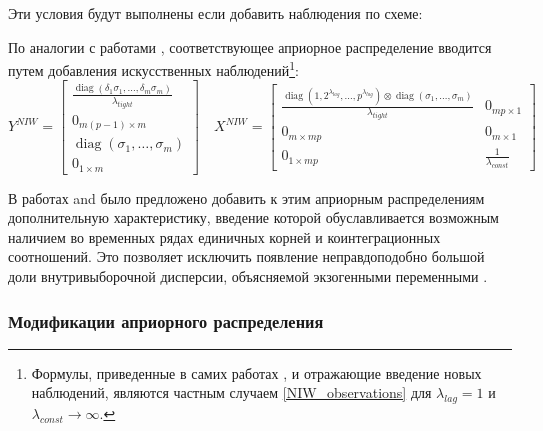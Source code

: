 \documentclass[11pt]{article} %
\DeclareMathOperator{\diag}{diag}
\begin{document}
Эти условия будут выполнены если добавить наблюдения по схеме:

По аналогии с  работами  \cite{banbura_al_2010}, \cite{berg_henzel_2013} соответствующее априорное распределение вводится путем добавления искусственных наблюдений\footnote{Формулы, приведенные в самих работах \cite{banbura_al_2010}, \cite{berg_henzel_2013} и отражающие введение новых наблюдений, являются частным случаем \eqref{NIW_observations} для $\lambda_{lag}=1$ и $\lambda_{const}\to\infty$.}:
\begin{equation}
Y^{NIW}=\begin{bmatrix}
\frac{\diag(\delta_1\sigma_1,\ldots, \delta_m\sigma_m)}{\lambda_{tight}}\\
0_{m(p-1)\times m}\\
\diag(\sigma_1,\ldots,\sigma_m)\\
0_{1\times m}
\end{bmatrix}
\quad
%
X^{NIW}=\begin{bmatrix}
\frac{\diag(1,2^{\lambda_{lag}},\ldots, p^{\lambda_{lag}})\otimes \diag(\sigma_1,\ldots,\sigma_m)}{\lambda_{tight}} & 0_{mp\times 1} \\
0_{m\times mp}&0_{m\times 1}\\
0_{1\times mp}&\frac{1}{\lambda_{const}}
\end{bmatrix}\label{NIW_observations}
\end{equation}





В работах \cite{doan_al_1984} and \cite{sims_1993} было предложено добавить к этим априорным распределениям дополнительную характеристику, введение которой обуславливается возможным наличием во временных рядах единичных корней и коинтеграционных  соотношений. Это позволяет исключить появление неправдоподобно большой доли внутривыборочной дисперсии, объясняемой экзогенными переменными \cite{carriero_al_2015}. %



\subsubsection*{Модификации априорного распределения}
\end{document}
